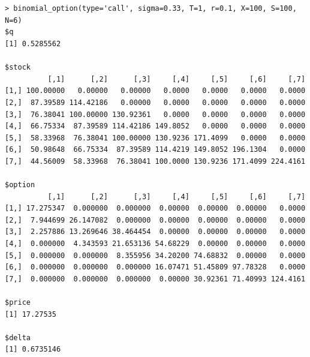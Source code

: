\documentclass[11pt]{scrartcl}
\begin{document}
\section{}

\subsection{}

\begin{lstlisting}
> binomial_option(type='call', sigma=0.33, T=1, r=0.1, X=100, S=100, N=6)
$q
[1] 0.5285562

$stock
          [,1]      [,2]      [,3]     [,4]     [,5]     [,6]     [,7]
[1,] 100.00000   0.00000   0.00000   0.0000   0.0000   0.0000   0.0000
[2,]  87.39589 114.42186   0.00000   0.0000   0.0000   0.0000   0.0000
[3,]  76.38041 100.00000 130.92361   0.0000   0.0000   0.0000   0.0000
[4,]  66.75334  87.39589 114.42186 149.8052   0.0000   0.0000   0.0000
[5,]  58.33968  76.38041 100.00000 130.9236 171.4099   0.0000   0.0000
[6,]  50.98648  66.75334  87.39589 114.4219 149.8052 196.1304   0.0000
[7,]  44.56009  58.33968  76.38041 100.0000 130.9236 171.4099 224.4161

$option
          [,1]      [,2]      [,3]     [,4]     [,5]     [,6]     [,7]
[1,] 17.275347  0.000000  0.000000  0.00000  0.00000  0.00000   0.0000
[2,]  7.944699 26.147082  0.000000  0.00000  0.00000  0.00000   0.0000
[3,]  2.257886 13.269646 38.464454  0.00000  0.00000  0.00000   0.0000
[4,]  0.000000  4.343593 21.653136 54.68229  0.00000  0.00000   0.0000
[5,]  0.000000  0.000000  8.355956 34.20200 74.68832  0.00000   0.0000
[6,]  0.000000  0.000000  0.000000 16.07471 51.45809 97.78328   0.0000
[7,]  0.000000  0.000000  0.000000  0.00000 30.92361 71.40993 124.4161

$price
[1] 17.27535

$delta
[1] 0.6735146
\end{lstlisting}

\subsection{}
\end{document}
